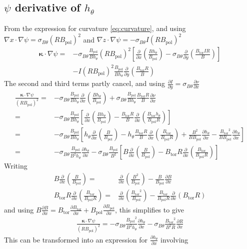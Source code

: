 \documentclass[12pt]{article}
\newcommand{\sbt}{\ensuremath{\sigma_{B\theta}}}
\newcommand{\deriv}[2]{\ensuremath{\frac{\partial #1}{\partial #2}}}
\newcommand{\hthe}{\ensuremath{h_\theta}}
\newcommand{\Bp}{\ensuremath{B_{\text{pol}}}}
\newcommand{\Bt}{\ensuremath{B_{\text{tor}}}}
\newcommand{\ve}[1]{\ensuremath{\boldsymbol{#1}}}
\newcommand{\kvec}{\ve{\kappa}}
\newcommand{\rbp}{\ensuremath{R\Bp}}
\newcommand{\rbpsq}{\ensuremath{\left(\rbp\right)^2}}
\begin{document}
\subsection{$\psi$ derivative of $\hthe$}
From the expression for curvature \ref{eq:curvature}, and using $\nabla x \cdot
\nabla \psi = \sbt \left(R\Bp\right)^2$ and $\nabla z\cdot\nabla \psi = -\sbt I
\left(R\Bp\right)^2$
%
\begin{align*}
\kvec\cdot\nabla\psi =& -\sbt
\frac{\Bp}{B\hthe}\rbpsq\left[\deriv{}{x}\left(\frac{B\hthe}{\Bp}\right) -
\sbt\deriv{}{y}\left(\frac{\Bt IR}{B}\right)\right] \\
&- I\rbpsq \frac{\Bp}{B\hthe}\deriv{}{y}\left(\frac{\Bt R}{B}\right)
\end{align*}
%
The second and third terms partly cancel, and using $\deriv{I}{y} = \sbt
\deriv{\nu}{x}$
%
\begin{align*}
  \frac{\kvec\cdot\nabla\psi}{\rbpsq} =&
-\sbt\frac{\Bp}{B\hthe}\deriv{}{x}\left(\frac{B\hthe}{\Bp}\right) +
\sbt\frac{\Bp}{B\hthe}\frac{\Bt R}{B}\deriv{\nu}{x} \\
  =& -\sbt\frac{\Bp}{B\hthe}\left[\deriv{}{x}\left(\frac{B\hthe}{\Bp}\right) -
\frac{\Bt R}{B}\deriv{}{x}\left(\frac{\Bt\hthe}{\Bp R}\right)\right] \\
  =& -\sbt\frac{\Bp}{B\hthe}\left[\hthe\deriv{}{x}\left(\frac{B}{\Bp}\right) -
\hthe\frac{\Bt R}{B}\deriv{}{x}\left(\frac{\Bt}{\Bp R}\right) +
\frac{B^2}{B\Bp}\deriv{\hthe}{x} - \frac{\Bt^2}{B\Bp}\deriv{\hthe}{x}\right] \\
  =& -\sbt \frac{\Bp}{B^2\hthe}\deriv{\hthe}{x} -
\sbt\frac{\Bp}{B^2}\left[B\deriv{}{x}\left(\frac{B}{\Bp}\right) - \Bt
R\deriv{}{x}\left(\frac{\Bt}{\Bp R}\right)\right]
\end{align*}
%
Writing
%
\begin{align*}
B\deriv{}{x}\left(\frac{B}{\Bp}\right) =&
\deriv{}{x}\left(\frac{B^2}{\Bp}\right) - \frac{B}{\Bp}\deriv{B}{x} \\
\Bt R\deriv{}{x}\left(\frac{\Bt}{\Bp R}\right) =&
\deriv{}{x}\left(\frac{\Bt^2}{\Bp}\right) - \frac{\Bt}{\Bp
R}\deriv{}{x}\left(\Bt R\right)
\end{align*}
%
and using $B\deriv{B}{x} = \Bt\deriv{\Bt}{x} + \Bp\deriv{\Bp}{x}$, this
simplifies to give
%
\begin{align}
\frac{\kvec\cdot\nabla\psi}{\rbpsq} =
-\sbt\frac{\Bp^2}{B^2\hthe}\deriv{\hthe}{x} - \sbt\frac{\Bt^2}{B^2
R}\deriv{R}{x}
\label{eq:dhdpsi}
\end{align}
%
This can be transformed into an expression for $\deriv{\hthe}{x}$ involving
\end{document}
